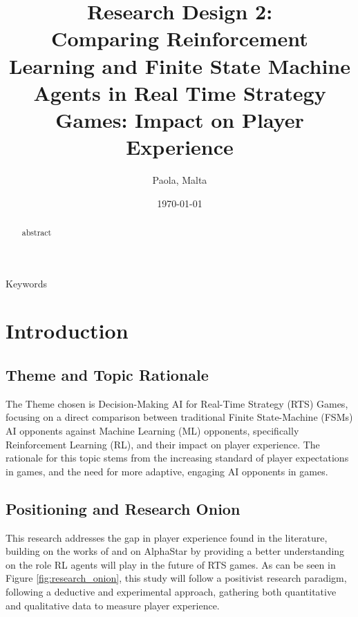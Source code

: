 \documentclass[conference]{IEEEtran}
\begin{document}
\title{Research Design 2:\\ Comparing Reinforcement Learning and Finite State Machine Agents in Real Time Strategy Games: Impact on Player Experience}

\author{
	Paola, Malta
}

\date{\today}

\maketitle

\begin{abstract}
	abstract
\end{abstract}

\begin{IEEEkeywords}
	Keywords
\end{IEEEkeywords}

\section{Introduction}

\subsection{Theme and Topic Rationale}

The Theme chosen is Decision-Making AI for Real-Time Strategy (RTS) Games, focusing on a direct comparison between traditional Finite State-Machine (FSMs) AI opponents against Machine Learning (ML) opponents, 
specifically Reinforcement Learning (RL), and their impact on player experience. The rationale for this topic stems from the increasing standard of player expectations in games, and the need for more adaptive,
engaging AI opponents in games.

\subsection{Positioning and Research Onion}
This research addresses the gap in player experience found in the literature, building on the works of \cite{grech_creating_2023} and \cite{vinyals_grandmaster_2019} on AlphaStar by providing a 
better understanding on the role RL agents will play in the future of RTS games. As can be seen in Figure \ref{fig:research_onion}, this study will follow a positivist research paradigm, 
following a deductive and experimental approach, gathering both quantitative and qualitative data to measure player experience.
\end{document}
